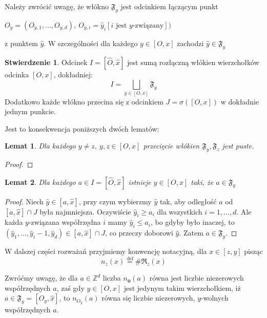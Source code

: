 \documentclass[licencjacka]{pracamgr}
\theoremstyle{definition}
\theoremstyle{definition}
\theoremstyle{definition}
\newtheorem{proposition}{Stwierdzenie}[section]
\theoremstyle{definition}
\theoremstyle{definition}
\theoremstyle{plain}
\newtheorem{lemma}{Lemat}[section]
\theoremstyle{plain}
\begin{document}

Należy zwrócić uwagę, że włókno $ \mathfrak{F}_y $ jest odcinkiem łączącym punkt 

$ O_y =(O_{y,1}, \dots, O_{y,d}), ~O_{y,i} = \hat y_i[ i \text{ jest } y \text{-związany}]) $

z punktem $\hat y$. W szczególności dla każdego $ y \in [O,x] $ zachodzi $ \hat y \in 
\mathfrak{F}_y $

\begin{proposition}
	Odcinek $ I = [\hat O, \hat x] $ jest sumą rozłączną włókien wierzchołków 
	odcinka $ [O, x] $, dokładniej:
	$$ I = \bigsqcup\limits_{y \in [O,x]} \mathfrak{F}_y $$
	Dodatkowo każde włókno przecina się z odcinkiem $ J = \sigma([O,x]) $ w dokładnie 
	jednym punkcie.
\end{proposition}
Jest to konsekwencja poniższych dwóch lematów:
\begin{lemma}
	Dla każdego $ y \neq z, ~ y,z \in [O,x] $ przecięcie włókien $ \mathfrak{F}_y, 
	\mathfrak{F}_z $ jest puste.
\end{lemma}

\begin{proof}
\end{proof}

\begin{lemma}
	Dla każdego $ a \in I = [\hat O, \hat x] $ istnieje $ y \in [O,x] $ taki, że 
	$ a \in \mathfrak{F}_y $
\end{lemma}
\begin{proof}
	Niech $ \hat y  \in [a,\hat x] $, przy czym wybierzmy $ \hat y $ tak, aby odległość 
	$ a $ od $ [a, \hat x] \cap J $ 
	była najmniejsza. Oczywiście $ \hat y_i \geq a_i $ dla wszystkich $ i = 1, \dots, 
	d $. Ale każda $ y $-związana współrzędna $ i $ mamy $ \hat y_i \leq a_i$, bo gdyby 
	było inaczej, to $ (\hat y_1, \dots, \hat y_i - 1, \hat y_d) \in [a, \hat x] \cap J $, 
	co przeczy doborowi $ \hat y $. Zatem $ a \in \mathfrak{F}_y $.
\end{proof}

W dalszej części rozważań przyjmiemy konwencję notacyjną, dla $ x \in[z,y] $ pisząc 
$$ n_z(x) \stackrel{\text{def}}{=} \# \mathfrak{R}_z(x) $$

Zwróćmy uwagę, że dla $ a \in \mathbb{Z}^d $ liczba $  n_{\textbf{0}}(a)$ równa jest 
liczbie niezerowych współrzędnych $ a $, zaś gdy $ y\in[O,x] $ jest jedynym takim 
wierzchołkiem, iż $ a \in \mathfrak{F}_y = [O_y, \hat x]$, to $ n_{O_y}(a) $ równa się 
liczbie niezerowych, $ y $-wolnych współrzędnych $ a $.
\end{document}
